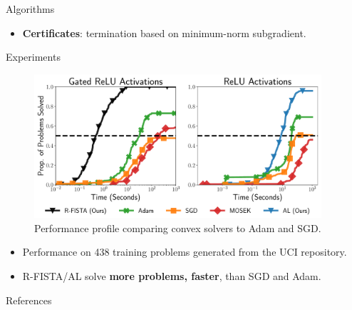 \documentclass[12pt, usenames, dvipsnames]{beamer}
\newlength{\sepwidth}
\newlength{\colwidth}
\newcommand{\separatorcolumn}{\begin{column}{\sepwidth}\end{column}}
\begin{document}
\begin{frame}[t]
\begin{columns}[t]
\begin{column}{\colwidth}
\begin{block}{Algorithms}
\begin{itemize}
					\item \textbf{Certificates}: termination based on minimum-norm subgradient.
				\end{itemize}
			\end{block}
			\vspace{-1em}
			\begin{block}{Experiments}
				\large
				\begin{figure}[]
					\centering
					\includegraphics[width=\textwidth]{assets/pp_main.pdf}
					\caption{Performance profile comparing convex solvers to Adam and SGD.}
					\label{fig:performance-profile}
				\end{figure}
				\vspace{-0.5em}
				\begin{itemize}
					\item Performance on 438 training problems generated from the UCI repository.
					\item R-FISTA/AL solve \textbf{more problems, faster}, than SGD and Adam.
				\end{itemize}
			\end{block}
			\vspace{-1em}
			\begin{block}{References}

				\footnotesize{
					
				}
				

			\end{block}

		\end{column}

		\separatorcolumn
	\end{columns}
\end{frame}
\end{document}
